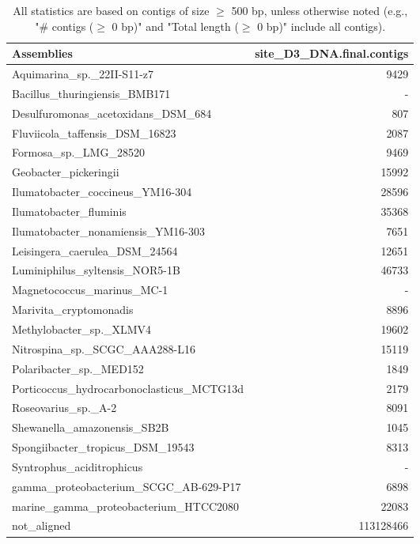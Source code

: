 \documentclass[12pt,a4paper]{article}
\begin{document}
\begin{table}[ht]
\begin{center}
\caption{All statistics are based on contigs of size $\geq$ 500 bp, unless otherwise noted (e.g., "\# contigs ($\geq$ 0 bp)" and "Total length ($\geq$ 0 bp)" include all contigs).}
\begin{tabular}{|l*{1}{|r}|}
\hline
Assemblies & site\_D3\_DNA.final.contigs \\ \hline
Aquimarina\_sp.\_22II-S11-z7 & 9429 \\ \hline
Bacillus\_thuringiensis\_BMB171 & - \\ \hline
Desulfuromonas\_acetoxidans\_DSM\_684 & 807 \\ \hline
Fluviicola\_taffensis\_DSM\_16823 & 2087 \\ \hline
Formosa\_sp.\_LMG\_28520 & 9469 \\ \hline
Geobacter\_pickeringii & 15992 \\ \hline
Ilumatobacter\_coccineus\_YM16-304 & 28596 \\ \hline
Ilumatobacter\_fluminis & 35368 \\ \hline
Ilumatobacter\_nonamiensis\_YM16-303 & 7651 \\ \hline
Leisingera\_caerulea\_DSM\_24564 & 12651 \\ \hline
Luminiphilus\_syltensis\_NOR5-1B & 46733 \\ \hline
Magnetococcus\_marinus\_MC-1 & - \\ \hline
Marivita\_cryptomonadis & 8896 \\ \hline
Methylobacter\_sp.\_XLMV4 & 19602 \\ \hline
Nitrospina\_sp.\_SCGC\_AAA288-L16 & 15119 \\ \hline
Polaribacter\_sp.\_MED152 & 1849 \\ \hline
Porticoccus\_hydrocarbonoclasticus\_MCTG13d & 2179 \\ \hline
Roseovarius\_sp.\_A-2 & 8091 \\ \hline
Shewanella\_amazonensis\_SB2B & 1045 \\ \hline
Spongiibacter\_tropicus\_DSM\_19543 & 8313 \\ \hline
Syntrophus\_aciditrophicus & - \\ \hline
gamma\_proteobacterium\_SCGC\_AB-629-P17 & 6898 \\ \hline
marine\_gamma\_proteobacterium\_HTCC2080 & 22083 \\ \hline
not\_aligned & 113128466 \\ \hline
\end{tabular}
\end{center}
\end{table}
\end{document}

